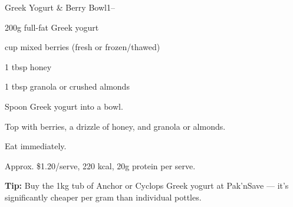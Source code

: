 \begin{recipebox}{Greek Yogurt \& Berry Bowl}{1}{--}
\begin{ingredients}
  \item 200g full-fat Greek yogurt
  \item \textonehalf{} cup mixed berries (fresh or frozen/thawed)
  \item 1 tbsp honey
  \item 1 tbsp granola or crushed almonds
\end{ingredients}

\begin{method}
  \item Spoon Greek yogurt into a bowl.
  \item Top with berries, a drizzle of honey, and granola or almonds.
  \item Eat immediately.
\end{method}

\begin{notelist}
  \item Approx. \$1.20/serve, 220 kcal, 20g protein per serve.
  \item \textbf{Tip:} Buy the 1kg tub of Anchor or Cyclops Greek yogurt at Pak'nSave --- it's significantly cheaper per gram than individual pottles.
\end{notelist}
\end{recipebox}
